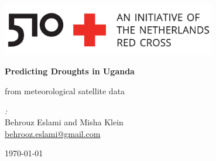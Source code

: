 \documentclass[10pt,parskip=half,
toc=sectionentrywithdots,
bibliography=totocnumbered,
captions=tableheading,numbers=noendperiod]{scrartcl}
\begin{document}
    \begin{titlepage}
  \begin{flushright}
    \includegraphics[width=0.7\textwidth]{Uganda_logit_model_files/510logo.png}
  \end{flushright}

  \begin{center}

  \vspace*{1cm}

  \Huge\textbf{Predicting Droughts in Uganda}

  \vspace{0.5cm}\LARGE{from meteorological satellite data}

  \vspace{1.5cm}

  \begin{minipage}{0.8\textwidth}
    \begin{center}
    \begin{minipage}{0.39\textwidth}
    \begin{flushleft} \Large
    \emph{:}\\Behrouz Eslami and Misha Klein\\\href{mailto:behrooz.eslami@gmail.com}{behrooz.eslami@gmail.com}
    \end{flushleft}
    \end{minipage}
    \hspace{\fill}
    \begin{minipage}{0.39\textwidth}
    \begin{flushright} \Large
    \end{flushright}
    \end{minipage}
    \end{center}
  \end{minipage}

  \vfill

  \begin{minipage}{0.8\textwidth}
  \begin{center}
  \end{center}
  \end{minipage}

  \vspace{0.8cm}

  \vspace{0.4cm}

  \today

  \end{center}
  \end{titlepage}
\end{document}
